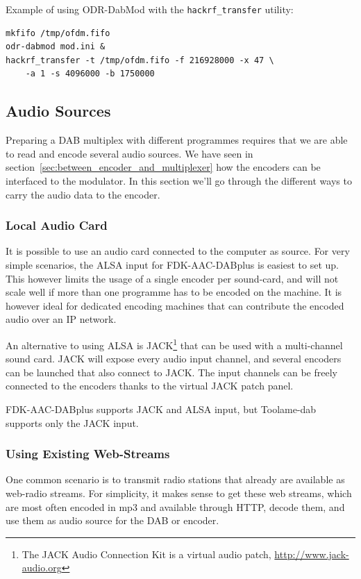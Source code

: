 Example of using ODR-DabMod with the \texttt{hackrf\_transfer} utility:

\begin{lstlisting}
mkfifo /tmp/ofdm.fifo
odr-dabmod mod.ini &
hackrf_transfer -t /tmp/ofdm.fifo -f 216928000 -x 47 \
    -a 1 -s 4096000 -b 1750000
\end{lstlisting}



\subsection{Audio Sources}
Preparing a DAB multiplex with different programmes requires that we are able to
read and encode several audio sources. We have seen in
section~\ref{sec:between_encoder_and_multiplexer} how the encoders can be
interfaced to the modulator. In this section we'll go through the different ways
to carry the audio data to the encoder.

\subsubsection{Local Audio Card}
It is possible to use an audio card connected to the computer as source. For
very simple scenarios, the ALSA input for FDK-AAC-DABplus is easiest to set up.
This however limits the usage of a single encoder per sound-card, and will not
scale well if more than one programme has to be encoded on the machine. It is
however ideal for dedicated encoding machines that can contribute the encoded
audio over an IP network.

An alternative to using ALSA is JACK\footnote{The JACK Audio Connection Kit is a
    virtual audio patch, \url{http://www.jack-audio.org}}
that can be used with a multi-channel sound card. JACK will expose every audio
input channel, and several encoders can be launched that also connect to JACK.
The input channels can be freely connected to the encoders thanks to the virtual
JACK patch panel.

FDK-AAC-DABplus supports JACK and ALSA input, but Toolame-dab supports only the
JACK input.

\subsubsection{Using Existing Web-Streams}
One common scenario is to transmit radio stations that already are available as
web-radio streams. For simplicity, it makes sense to get these web streams,
which are most often encoded in mp3 and available through HTTP, decode them, and
use them as audio source for the DAB or \dabplus encoder.

